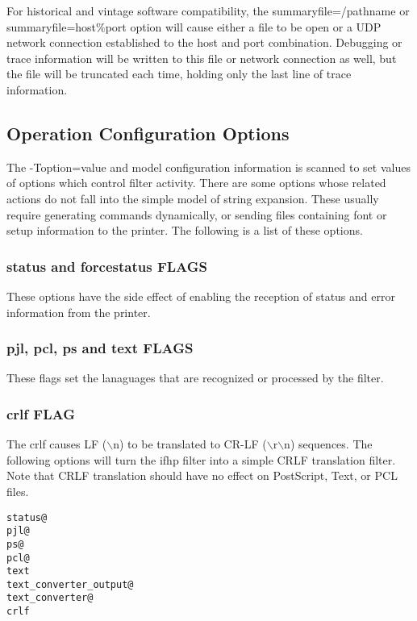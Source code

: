 \documentclass[a4paper]{article}
\begin{document}
\label{summaryfile}
For historical and vintage software compatibility,
the
{\ttfamily summaryfile=/pathname}
or
{\ttfamily summaryfile=host\%port}
option will cause either a file to be open or a UDP network connection
established to the host  and port combination.
Debugging or trace information will be written to this file or network
connection as well, but the file will be truncated each time,
holding only the last line of trace information.




\subsection{Operation Configuration Options}

\label{optioninit}
\label{status}
\label{forcestatus}
\label{pjl}
\label{pcl}
\label{ps}
\label{text}
The
{\ttfamily -Toption=value}
and model configuration information is scanned
to set values of options which control filter activity.
There are some options whose related actions do not fall into
the simple model of string expansion.
These usually require generating commands dynamically,
or sending files containing font or setup information to the printer.
The following is a list of these options.


\subsubsection{status and forcestatus FLAGS}

These options have the side effect of enabling the reception of status
and error information from the printer.


\subsubsection{pjl, pcl, ps and text FLAGS}

These flags set the lanaguages that are recognized or processed by
the filter.


\subsubsection{crlf FLAG
\label{crlf}}

The
{\ttfamily crlf}
causes LF ({\ttfamily $\backslash$n}) to be translated to CR-LF
({\ttfamily $\backslash$r$\backslash$n}) sequences.
The following options will turn the
{\ttfamily ifhp}
filter into a simple CRLF translation filter.
Note that CRLF translation should have no effect
on PostScript, Text, or PCL files.
\begin{tscreen}
\begin{verbatim}
status@
pjl@
ps@
pcl@
text
text_converter_output@
text_converter@
crlf
\end{verbatim}
\end{tscreen}
\end{document}
